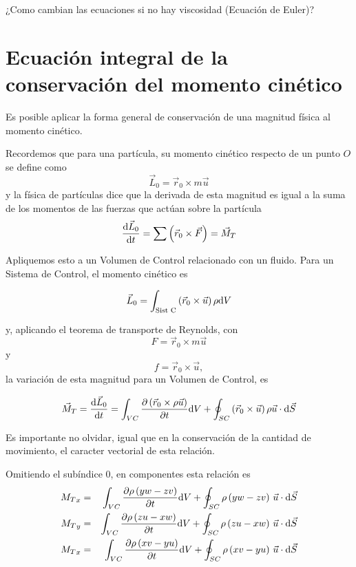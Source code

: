 		¿Como cambian las ecuaciones si no hay viscosidad (Ecuación de Euler)?
		
\section{Ecuación integral de la conservación del momento cinético}

	
	Es posible aplicar la forma general de conservación de una magnitud
	física al momento cinético.
	
	Recordemos que para una partícula, su momento cinético respecto de
	un punto $O$ se define como 
	\[
	\vec{L}_{0}=\vec{r}_{0}\times m\vec{u}
	\]
	y la física de partículas dice que la derivada de esta magnitud es
	igual a la suma de los momentos de las fuerzas que actúan sobre la
	partícula 
	\[
	\frac{\textrm{d} \vec{L}_{0}}{\textrm{d} t}=\sum\left(\vec{r}_{0}\times\vec{F}\right)={\vec{M}_{T}}
	\]
	

	
	Apliquemos esto a un Volumen de Control relacionado con un fluido.
	Para un Sistema de Control, el momento cinético es 
	
	\begin{equation}
		\vec{L}_{0}=\int_{\text{Sist C}}\left(\vec{r}_{0}\times\vec{u}\right)\rho\text{d} V
	\end{equation}
	
	y, aplicando el teorema de transporte de Reynolds, con 
	\[
	F=\vec{r}_{0}\times m\vec{u}
	\]
	y 
	\[
	f=\vec{r}_{0}\times\vec{u},
	\]
	la variación de esta magnitud para un Volumen de Control, es 
	
	\begin{equation}
		{\vec{M}_{T}}=\frac{\textrm{d} \vec{L}_{0}}{\textrm{d} t}=\int_{VC}\frac{\partial \left(\vec{r}_{0}\times\rho\vec{u}\right)}{\partial t}\text{d} V+\oint_{SC}\left(\vec{r}_{0}\times\vec{u}\right)\rho\vec{u}\cdot\text{d}\vec{S}
	\end{equation}
	
	
	
	Es importante no olvidar, igual que en la conservación de la cantidad
	de movimiento, el caracter vectorial de esta relación.
	
	Omitiendo el subíndice $0$, en componentes esta relación es 
	\begin{eqnarray}
		{M_{T}}_{x} & = & \int_{VC}\frac{\partial \rho\left(yw-zv\right)}{\partial t}\text{d} V+\oint_{SC}\rho\left(yw-zv\right)\,\vec{u}\cdot\text{d}\vec{S}\\
		{M_{T}}_{y} & = & \int_{VC}\frac{\partial \rho\left(zu-xw\right)}{\partial t}\text{d} V+\oint_{SC}\rho\left(zu-xw\right)\,\vec{u}\cdot\text{d}\vec{S}\\
		{M_{T}}_{x} & = & \int_{VC}\frac{\partial \rho\left(xv-yu\right)}{\partial t}\text{d} V+\oint_{SC}\rho\left(xv-yu\right)\,\vec{u}\cdot\text{d}\vec{S}
	\end{eqnarray}
	
